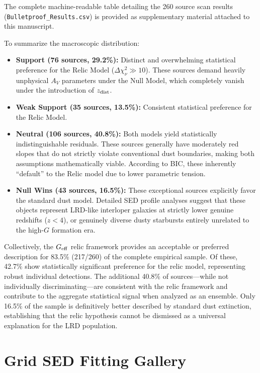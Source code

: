 \documentclass[twocolumn]{aastex631}
\begin{document}
The complete machine-readable table detailing the 260 source scan results (\texttt{Bulletproof\_Results.csv}) is provided as supplementary material attached to this manuscript. 

To summarize the macroscopic distribution:
\begin{itemize}
    \item \textbf{Support (76 sources, 29.2\%):} Distinct and overwhelming statistical preference for the Relic Model ($\Delta \chi^2_{\nu} \gg 10$). These sources demand heavily unphysical $A_V$ parameters under the Null Model, which completely vanish under the introduction of $z_{\rm dist}$.
    \item \textbf{Weak Support (35 sources, 13.5\%):} Consistent statistical preference for the Relic Model.
    \item \textbf{Neutral (106 sources, 40.8\%):} Both models yield statistically indistinguishable residuals. These sources generally have moderately red slopes that do not strictly violate conventional dust boundaries, making both assumptions mathematically viable. According to BIC, these inherently ``default'' to the Relic model due to lower parametric tension.
    \item \textbf{Null Wins (43 sources, 16.5\%):} These exceptional sources explicitly favor the standard dust model. Detailed SED profile analyses suggest that these objects represent LRD-like interloper galaxies at strictly lower genuine redshifts ($z < 4$), or genuinely diverse dusty starbursts entirely unrelated to the high-$G$ formation era.
\end{itemize}

Collectively, the $G_{\rm eff}$ relic framework provides an acceptable or preferred description for 83.5\% (217/260) of the complete empirical sample. Of these, 42.7\% show statistically significant preference for the relic model, representing robust individual detections. The additional 40.8\% of sources---while not individually discriminating---are consistent with the relic framework and contribute to the aggregate statistical signal when analyzed as an ensemble. Only 16.5\% of the sample is definitively better described by standard dust extinction, establishing that the relic hypothesis cannot be dismissed as a universal explanation for the LRD population.

\section{Grid SED Fitting Gallery} \label{sec:appendix_c}
\end{document}
